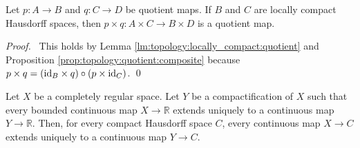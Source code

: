  \begin{thm}
 Let $p : A \rightarrow B$ and $q : C \rightarrow D$ be quotient maps. If $B$
and $C$ are locally compact Hausdorff spaces, then $p \times q : A \times C
\rightarrow B \times D$ is a quotient map.
\end{thm}

\begin{proof}
  \pf\ This holds by Lemma
\ref{lm:topology:locally_compact:quotient} and Proposition
\ref{prop:topology:quotient:composite} because $p \times q = (\mathrm{id}_{B} \times q)
\circ (p \times
\mathrm{id}_{C})$. \qed
\end{proof}

\begin{thm}
  Let $X$ be a completely regular space. Let $Y$ be a compactification of $X$ such that every bounded continuous map $X \rightarrow \mathbb{R}$
  extends uniquely to a continuous map $Y \rightarrow \mathbb{R}$. Then, for every compact Hausdorff space $C$, every continuous map $X \rightarrow C$ extends uniquely to a continuous map $Y \rightarrow C$.
\end{thm}

